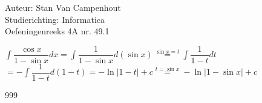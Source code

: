 \documentclass[a4paper]{article}
\begin{document}
  
\noindent \large Auteur: Stan Van Campenhout \\
\noindent \large Studierichting:  Informatica\\
\noindent \large Oefeningenreeks 4A nr. 49.1\\

\medskip

\normalsize

$ \displaystyle\int\dfrac{\cos x}{1-\sin x}dx = \displaystyle\int\dfrac{1}{1-\sin x}d\left(\sin x\right)
\stackrel{\sin x = t}{=} \displaystyle\int\dfrac{1}{1-t}dt $\\

$ = -\displaystyle\int\dfrac{1}{1-t}d\left(1-t\right) = -\ln|1-t| + c \stackrel{t = \sin x}{=} -\ln|1-\sin x| + c $\\

\begin{thebibliography}{999}
\end{thebibliography}
\end{document}
